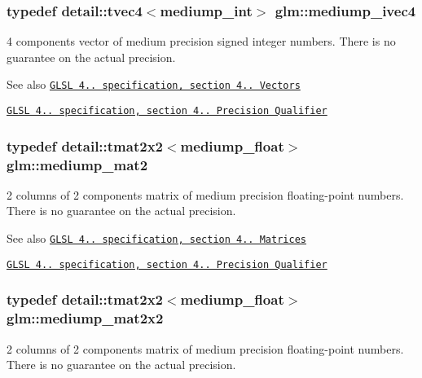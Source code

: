 \subsubsection[{mediump\+\_\+ivec4}]{\setlength{\rightskip}{0pt plus 5cm}typedef detail\+::tvec4$<$mediump\+\_\+int$>$ {\bf glm\+::mediump\+\_\+ivec4}}\label{group__core__precision_gaabd2534479a6e7e493a7362b9f4c63cd}
4 components vector of medium precision signed integer numbers. There is no guarantee on the actual precision.

\begin{DoxySeeAlso}{See also}
\href{http://www.opengl.org/registry/doc/GLSLangSpec.4.20.8.pdf}{\tt G\+L\+S\+L 4.. specification, section 4.. Vectors} 

\href{http://www.opengl.org/registry/doc/GLSLangSpec.4.20.8.pdf}{\tt G\+L\+S\+L 4.. specification, section 4.. Precision Qualifier} 
\end{DoxySeeAlso}
\hypertarget{group__core__precision_gae67a4f24fb96b68e0f0346ef4212db61}{}
\subsubsection[{mediump\+\_\+mat2}]{\setlength{\rightskip}{0pt plus 5cm}typedef detail\+::tmat2x2$<$mediump\+\_\+float$>$ {\bf glm\+::mediump\+\_\+mat2}}\label{group__core__precision_gae67a4f24fb96b68e0f0346ef4212db61}
2 columns of 2 components matrix of medium precision floating-\/point numbers. There is no guarantee on the actual precision.

\begin{DoxySeeAlso}{See also}
\href{http://www.opengl.org/registry/doc/GLSLangSpec.4.20.8.pdf}{\tt G\+L\+S\+L 4.. specification, section 4.. Matrices} 

\href{http://www.opengl.org/registry/doc/GLSLangSpec.4.20.8.pdf}{\tt G\+L\+S\+L 4.. specification, section 4.. Precision Qualifier} 
\end{DoxySeeAlso}
\hypertarget{group__core__precision_gaa78fd2384931c244700851141b8a47eb}{}
\subsubsection[{mediump\+\_\+mat2x2}]{\setlength{\rightskip}{0pt plus 5cm}typedef detail\+::tmat2x2$<$mediump\+\_\+float$>$ {\bf glm\+::mediump\+\_\+mat2x2}}\label{group__core__precision_gaa78fd2384931c244700851141b8a47eb}
2 columns of 2 components matrix of medium precision floating-\/point numbers. There is no guarantee on the actual precision.

